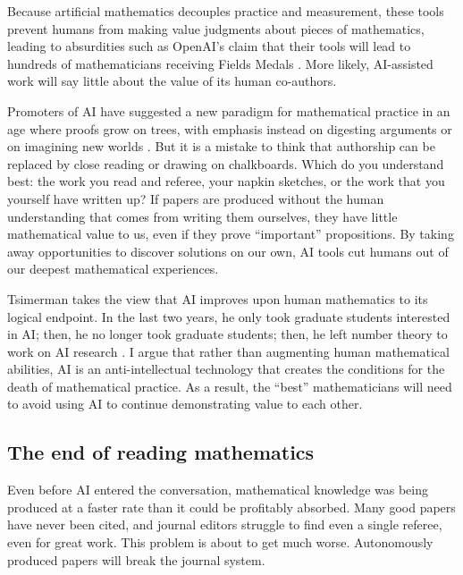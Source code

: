 \documentclass[12pt]{amsart}
\theoremstyle{definition}
\begin{document}
Because artificial mathematics decouples practice and measurement, these tools prevent humans from making value judgments about pieces of mathematics, leading to absurdities such as OpenAI's claim that their tools will lead to hundreds of mathematicians receiving Fields Medals \cite{taopromo}. More likely, AI-assisted work will say little about the value of its human co-authors.

Promoters of AI have suggested a new paradigm for mathematical practice in an age where proofs grow on trees, with emphasis instead on digesting arguments \cite{taomathstodon} or on imagining new worlds \cite{mathinc}. But it is a mistake to think that authorship can be replaced by close reading or drawing on chalkboards. Which do you understand best: the work you read and referee, your napkin sketches, or the work that you yourself have written up? If papers are produced without the human understanding that comes from writing them ourselves, they have little mathematical value to us, even if they prove ``important'' propositions. By taking away opportunities to discover solutions on our own, AI tools cut humans out of our deepest mathematical experiences.

Tsimerman takes the view that AI improves upon human mathematics to its logical endpoint. In the last two years, he only took graduate students interested in AI; then, he no longer took graduate students; then, he left number theory to work on AI research \cite{quantatsimerman}. I argue that rather than augmenting human mathematical abilities, AI is an anti-intellectual technology that creates the conditions for the death of mathematical practice.  As a result, the ``best'' mathematicians will need to avoid using AI to continue demonstrating value to each other.


\subsection*{The end of reading mathematics}

Even before AI entered the conversation, mathematical knowledge was being produced at a faster rate than it could be profitably absorbed. Many good papers have never been cited, and journal editors struggle to find even a single referee, even for great work. This problem is about to get much worse.
Autonomously produced papers will break the journal system.
\end{document}
